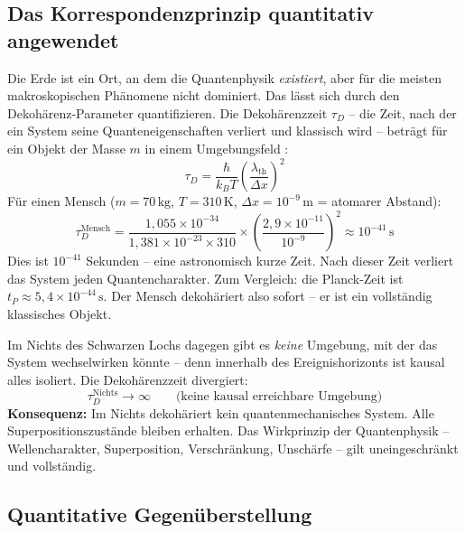﻿\documentclass[12pt,a4paper]{report}
\begin{document}
\subsection{Das Korrespondenzprinzip quantitativ angewendet}

Die Erde ist ein Ort, an dem die Quantenphysik \emph{existiert}, aber für die meisten makroskopischen Phänomene nicht dominiert. Das lässt sich durch den Dekohärenz-Parameter quantifizieren. Die Dekohärenzzeit $\tau_D$ -- die Zeit, nach der ein System seine Quanteneigenschaften verliert und klassisch wird -- beträgt für ein Objekt der Masse $m$ in einem Umgebungsfeld \cite{zurek2003}:
\begin{equation}
    \tau_D = \frac{\hbar}{k_B T} \left(\frac{\lambda_{\text{th}}}{\Delta x}\right)^2
    \label{eq:dekohaerenz}
\end{equation}
Für einen Mensch ($m = 70\,\text{kg}$, $T = 310\,\text{K}$, $\Delta x = 10^{-9}\,\text{m}$ = atomarer Abstand):
\begin{equation}
    \tau_D^{\text{Mensch}} = \frac{1{,}055 \times 10^{-34}}{1{,}381 \times 10^{-23} \times 310} \times \left(\frac{2{,}9 \times 10^{-11}}{10^{-9}}\right)^2 \approx 10^{-41}\,\text{s}
\end{equation}
Dies ist $10^{-41}$ Sekunden -- eine astronomisch kurze Zeit. Nach dieser Zeit verliert das System jeden Quantencharakter. Zum Vergleich: die Planck-Zeit ist $t_P \approx 5{,}4 \times 10^{-44}\,\text{s}$. Der Mensch dekohäriert also sofort -- er ist ein vollständig klassisches Objekt.

Im Nichts des Schwarzen Lochs dagegen gibt es \emph{keine} Umgebung, mit der das System wechselwirken könnte -- denn innerhalb des Ereignishorizonts ist kausal alles isoliert. Die Dekohärenzzeit divergiert:
\begin{equation}
    \tau_D^{\text{Nichts}} \to \infty \qquad \text{(keine kausal erreichbare Umgebung)}
    \label{eq:dekohaerenz_nichts}
\end{equation}
\textbf{Konsequenz:} Im Nichts dekohäriert kein quantenmechanisches System. Alle Superpositionszustände bleiben erhalten. Das Wirkprinzip der Quantenphysik -- Wellencharakter, Superposition, Verschränkung, Unschärfe -- gilt uneingeschränkt und vollständig.

\subsection{Quantitative Gegenüberstellung}
\end{document}
